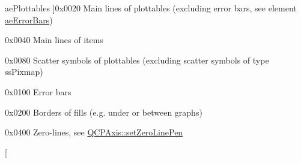 \begin{Desc}
\begin{description}
{\hypertarget{namespaceQCP_ae55dbe315d41fe80f29ba88100843a0ca4145e4251b0cf2dbedabeea0a38f84f6}{ae\-Plottables}\label{namespaceQCP_ae55dbe315d41fe80f29ba88100843a0ca4145e4251b0cf2dbedabeea0a38f84f6}
}]{\ttfamily 0x0020} Main lines of plottables (excluding error bars, see element \hyperlink{namespaceQCP_ae55dbe315d41fe80f29ba88100843a0ca9dcf3882cb321bb305f71fdc0f09f63d}{ae\-Error\-Bars}) \item[{\em 
\hypertarget{namespaceQCP_ae55dbe315d41fe80f29ba88100843a0caf7712a85d6b0c75b24301d2fe9484db3}{ae\-Items}\label{namespaceQCP_ae55dbe315d41fe80f29ba88100843a0caf7712a85d6b0c75b24301d2fe9484db3}
}]{\ttfamily 0x0040} Main lines of items \item[{\em 
\hypertarget{namespaceQCP_ae55dbe315d41fe80f29ba88100843a0cae45ed8cd167bffe27d7f40da4bc17e9c}{ae\-Scatters}\label{namespaceQCP_ae55dbe315d41fe80f29ba88100843a0cae45ed8cd167bffe27d7f40da4bc17e9c}
}]{\ttfamily 0x0080} Scatter symbols of plottables (excluding scatter symbols of type ss\-Pixmap) \item[{\em 
\hypertarget{namespaceQCP_ae55dbe315d41fe80f29ba88100843a0ca9dcf3882cb321bb305f71fdc0f09f63d}{ae\-Error\-Bars}\label{namespaceQCP_ae55dbe315d41fe80f29ba88100843a0ca9dcf3882cb321bb305f71fdc0f09f63d}
}]{\ttfamily 0x0100} Error bars \item[{\em 
\hypertarget{namespaceQCP_ae55dbe315d41fe80f29ba88100843a0ca788810f0aa930137de6ad6cc6d83d354}{ae\-Fills}\label{namespaceQCP_ae55dbe315d41fe80f29ba88100843a0ca788810f0aa930137de6ad6cc6d83d354}
}]{\ttfamily 0x0200} Borders of fills (e.\-g. under or between graphs) \item[{\em 
\hypertarget{namespaceQCP_ae55dbe315d41fe80f29ba88100843a0ca261f8ea78cf3c9561726223ffa33dc12}{ae\-Zero\-Line}\label{namespaceQCP_ae55dbe315d41fe80f29ba88100843a0ca261f8ea78cf3c9561726223ffa33dc12}
}]{\ttfamily 0x0400} Zero-\/lines, see \hyperlink{classQCPAxis_a533e5aa7fb4981ebc3db761d1e0e38d1}{Q\-C\-P\-Axis\-::set\-Zero\-Line\-Pen} \item[{\em 
}
\end{description}
\end{Desc}
